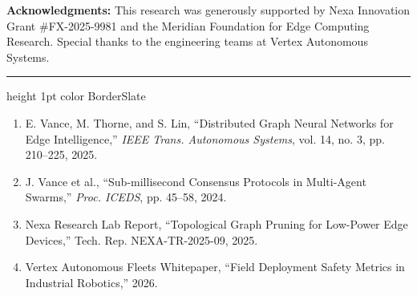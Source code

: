 \documentclass[portrait,a0b,posterscale=1.0]{a0poster}
\begin{document}
\begin{minipage}[t]{0.488\textwidth}
  \vspace{6mm}

  \begin{tcolorbox}[posterbox, title={\faFile\ 7. References \& Acknowledgments}]
    {\small
    \textbf{Acknowledgments:} This research was generously supported by Nexa Innovation Grant \#FX-2025-9981 and the Meridian Foundation for Edge Computing Research. Special thanks to the engineering teams at Vertex Autonomous Systems.
    }

    \vspace{3mm}
    \hrule height 1pt color BorderSlate
    \vspace{3mm}

    {\small
    \begin{enumerate}[leftmargin=8mm, label={\lbrack\arabic*\rbrack}]
      \item E. Vance, M. Thorne, and S. Lin, ``Distributed Graph Neural Networks for Edge Intelligence,'' \emph{IEEE Trans. Autonomous Systems}, vol. 14, no. 3, pp. 210--225, 2025.
      \item J. Vance et al., ``Sub-millisecond Consensus Protocols in Multi-Agent Swarms,'' \emph{Proc. ICEDS}, pp. 45--58, 2024.
      \item Nexa Research Lab Report, ``Topological Graph Pruning for Low-Power Edge Devices,'' Tech. Rep. NEXA-TR-2025-09, 2025.
      \item Vertex Autonomous Fleets Whitepaper, ``Field Deployment Safety Metrics in Industrial Robotics,'' 2026.
    \end{enumerate}
    }
  \end{tcolorbox}

\end{minipage}
\end{document}
